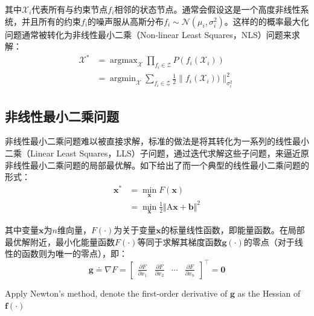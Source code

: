 其中$\mathcal{X}_i$代表所有与约束节点$f_i$相邻的状态节点。通常会假设这是一个高度非线性系统，并且所有的约束$f_i$的噪声服从高斯分布$f_i\sim\mathcal{N}(\mu_i, \sigma_i^2)$。这样的的概率最大化问题通常被转化为非线性最小二乘（Non-linear Least Squares，NLS）问题来求解：
\begin{equation}
\begin{aligned}
    \mathcal{X}^\ast &= \mathop{\arg\max}_{\mathcal{X}}
                        \prod_{f_i\in\mathcal{Z}} P(f_i(\mathcal{X}_i)) \\
                     &= \mathop{\arg\min}_{\mathcal{X}}
                        \sum_{f_i\in\mathcal{Z}} \frac{1}{2}
                        \lVert f_i(\mathcal{X}_i)) \rVert_{\sigma_i^2}^2
\end{aligned}
\end{equation}

\subsection{非线性最小二乘问题}

非线性最小二乘问题难以被直接求解，标准的做法是将其转化为一系列的线性最小二乘（Linear Least Squares，LLS）子问题，通过迭代求解这些子问题，来逼近原非线性最小二乘问题的局部最优解。如下给出了而一个典型的线性最小二乘问题的形式：
\begin{equation}
\begin{aligned}
    \bm{x}^\ast &= \mathop{\min}_{\bm{x}} F(\bm{x}) \\
                &= \mathop{\min}_{\bm{x}}
                   \frac{1}{2} \Vert \mathrm{A}\bm{x} + \bm{b} \Vert^2
\end{aligned}
\end{equation}

其中变量$\bm{x}$为$n$维向量，$F(\cdot)$为关于变量$\bm{x}$的标量线性函数，即能量函数。在局部最优解附近，最小化能量函数$F(\cdot)$等同于求解其梯度函数$\bm{g}(\cdot)$的零点（对于线性的函数则为唯一的零点），即：
\begin{equation}
    \bm{g} \doteq \nabla F = \begin{bmatrix}
        \frac{\partial F}{\partial x_1} &
        \frac{\partial F}{\partial x_2} &
        \cdots &
        \frac{\partial F}{\partial x_n}
    \end{bmatrix}^\top = \bm{0}
\end{equation}

Apply Newton's method, denote the first-order derivative of $\bm{g}$ as the Hessian of $\mathbf{f}(\cdot)$

